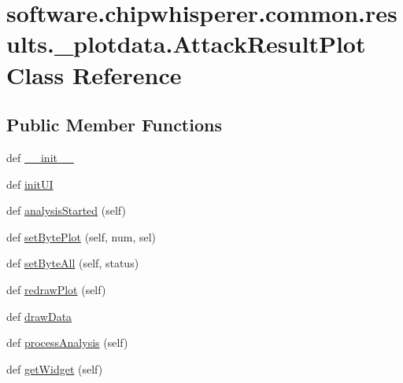 \hypertarget{classsoftware_1_1chipwhisperer_1_1common_1_1results_1_1__plotdata_1_1AttackResultPlot}{}\section{software.\+chipwhisperer.\+common.\+results.\+\_\+plotdata.\+Attack\+Result\+Plot Class Reference}
\label{classsoftware_1_1chipwhisperer_1_1common_1_1results_1_1__plotdata_1_1AttackResultPlot}
\subsection*{Public Member Functions}
\begin{DoxyCompactItemize}
\item 
def \hyperlink{classsoftware_1_1chipwhisperer_1_1common_1_1results_1_1__plotdata_1_1AttackResultPlot_ae2017d24ccf1a620e2492c392bb598e9}{\+\_\+\+\_\+init\+\_\+\+\_\+}
\item 
def \hyperlink{classsoftware_1_1chipwhisperer_1_1common_1_1results_1_1__plotdata_1_1AttackResultPlot_a33aae85bbc30a0029db627f345c7b2c3}{init\+U\+I}
\item 
def \hyperlink{classsoftware_1_1chipwhisperer_1_1common_1_1results_1_1__plotdata_1_1AttackResultPlot_a9664e2021137a04f78f90683a9468ae1}{analysis\+Started} (self)
\item 
def \hyperlink{classsoftware_1_1chipwhisperer_1_1common_1_1results_1_1__plotdata_1_1AttackResultPlot_aecd62c0884a92e8399c0cbcfd168ed11}{set\+Byte\+Plot} (self, num, sel)
\item 
def \hyperlink{classsoftware_1_1chipwhisperer_1_1common_1_1results_1_1__plotdata_1_1AttackResultPlot_ab60cc6ecb66d854f9de2a60b17a17ba5}{set\+Byte\+All} (self, status)
\item 
def \hyperlink{classsoftware_1_1chipwhisperer_1_1common_1_1results_1_1__plotdata_1_1AttackResultPlot_aab08736ab1ba86f837e26c74c1416555}{redraw\+Plot} (self)
\item 
def \hyperlink{classsoftware_1_1chipwhisperer_1_1common_1_1results_1_1__plotdata_1_1AttackResultPlot_a2be54c916777ae6a9d39b05a9ae5302b}{draw\+Data}
\item 
def \hyperlink{classsoftware_1_1chipwhisperer_1_1common_1_1results_1_1__plotdata_1_1AttackResultPlot_a8bd61f3835cee01792d61de9ec4403c3}{process\+Analysis} (self)
\item 
def \hyperlink{classsoftware_1_1chipwhisperer_1_1common_1_1results_1_1__plotdata_1_1AttackResultPlot_a14ce98178918e7e527b8c01bdad136e8}{get\+Widget} (self)
\end{DoxyCompactItemize}

